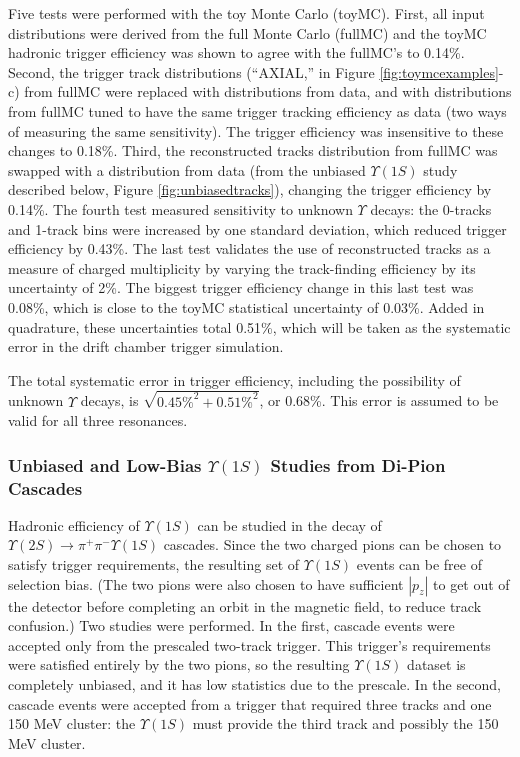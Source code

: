 \documentclass[aps,prd,preprint,superscriptaddress,tightenlines,nofootinbib,floatfix]{revtex4}
\begin{document}
Five tests were performed with the toy Monte Carlo (toyMC).  First,
all input distributions were derived from the full Monte Carlo
(fullMC) and the toyMC hadronic trigger efficiency was shown to agree
with the fullMC's to 0.14\%.  Second, the trigger track distributions
(``AXIAL,'' in Figure \ref{fig:toymcexamples}-c) from fullMC were
replaced with distributions from data, and with distributions from
fullMC tuned to have the same trigger tracking efficiency as data (two
ways of measuring the same sensitivity).  The trigger efficiency was
insensitive to these changes to 0.18\%.  Third, the reconstructed
tracks distribution from fullMC was swapped with a distribution from
data (from the unbiased $\Upsilon(1S)$ study described below, Figure
\ref{fig:unbiasedtracks}), changing the trigger efficiency by 0.14\%.
The fourth test measured sensitivity to unknown $\Upsilon$ decays: the
0-tracks and 1-track bins were increased by one standard deviation,
which reduced trigger efficiency by 0.43\%.  The last test validates
the use of reconstructed tracks as a measure of charged multiplicity
by varying the track-finding efficiency by its uncertainty of 2\%.
The biggest trigger efficiency change in this last test was 0.08\%,
which is close to the toyMC statistical uncertainty of 0.03\%.  Added
in quadrature, these uncertainties total 0.51\%, which will be taken
as the systematic error in the drift chamber trigger simulation.

The total systematic error in trigger efficiency, including the
possibility of unknown $\Upsilon$ decays, is $\sqrt{\mbox{0.45\%}^2 +
\mbox{0.51\%}^2}$, or 0.68\%.  This error is assumed to be valid for all three
resonances.

%
\subsubsection{Unbiased and Low-Bias $\Upsilon(1S)$ Studies from Di-Pion Cascades}
%

Hadronic efficiency of $\Upsilon(1S)$ can be studied in the decay of
$\Upsilon(2S) \to \pi^+\pi^- \Upsilon(1S)$ cascades.  Since the two
charged pions can be chosen to satisfy trigger requirements, the
resulting set of $\Upsilon(1S)$ events can be free of selection bias.
(The two pions were also chosen to have sufficient $|p_z|$ to get
out of the detector before completing an orbit in the magnetic
field, to reduce track confusion.)
Two studies were performed.  In the first, cascade events were
accepted only from the prescaled two-track trigger.  This trigger's
requirements were satisfied entirely by the two pions, so the
resulting $\Upsilon(1S)$ dataset is completely unbiased, and it has
low statistics due to the prescale.  In the second, cascade events
were accepted from a trigger that required three tracks and one 150
MeV cluster: the $\Upsilon(1S)$ must provide the third track and
possibly the 150 MeV cluster.
\end{document}
